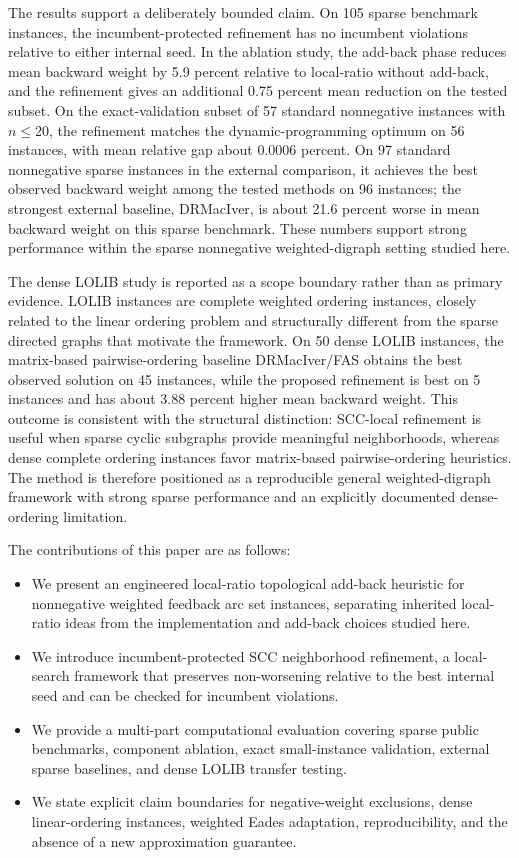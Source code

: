 The results support a deliberately bounded claim. On 105 sparse benchmark instances, the incumbent-protected refinement has no incumbent violations relative to either internal seed. In the ablation study, the add-back phase reduces mean backward weight by 5.9 percent relative to local-ratio without add-back, and the refinement gives an additional 0.75 percent mean reduction on the tested subset. On the exact-validation subset of 57 standard nonnegative instances with \(n \le 20\), the refinement matches the dynamic-programming optimum on 56 instances, with mean relative gap about 0.0006 percent. On 97 standard nonnegative sparse instances in the external comparison, it achieves the best observed backward weight among the tested methods on 96 instances; the strongest external baseline, DRMacIver, is about 21.6 percent worse in mean backward weight on this sparse benchmark. These numbers support strong performance within the sparse nonnegative weighted-digraph setting studied here.

The dense LOLIB study is reported as a scope boundary rather than as primary evidence. LOLIB instances are complete weighted ordering instances, closely related to the linear ordering problem and structurally different from the sparse directed graphs that motivate the framework. On 50 dense LOLIB instances, the matrix-based pairwise-ordering baseline DRMacIver/FAS obtains the best observed solution on 45 instances, while the proposed refinement is best on 5 instances and has about 3.88 percent higher mean backward weight. This outcome is consistent with the structural distinction: SCC-local refinement is useful when sparse cyclic subgraphs provide meaningful neighborhoods, whereas dense complete ordering instances favor matrix-based pairwise-ordering heuristics. The method is therefore positioned as a reproducible general weighted-digraph framework with strong sparse performance and an explicitly documented dense-ordering limitation.

The contributions of this paper are as follows:
\begin{itemize}
    \item We present an engineered local-ratio topological add-back heuristic for nonnegative weighted feedback arc set instances, separating inherited local-ratio ideas from the implementation and add-back choices studied here.
    \item We introduce incumbent-protected SCC neighborhood refinement, a local-search framework that preserves non-worsening relative to the best internal seed and can be checked for incumbent violations.
    \item We provide a multi-part computational evaluation covering sparse public benchmarks, component ablation, exact small-instance validation, external sparse baselines, and dense LOLIB transfer testing.
    \item We state explicit claim boundaries for negative-weight exclusions, dense linear-ordering instances, weighted Eades adaptation, reproducibility, and the absence of a new approximation guarantee.
\end{itemize}

